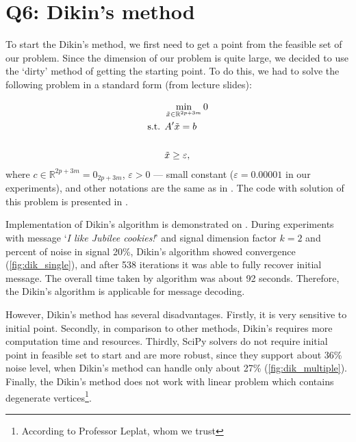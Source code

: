 \documentclass{article}
\def\R{\mathbb{R}}
\def\xt{\tilde{x}}
\begin{document}
\section{Q6: Dikin's method}

To start the Dikin's method, we first need to get a point from the feasible set of our problem. Since the dimension of our problem is quite large, we decided to use the `dirty' method of getting the starting point. To do this, we had to solve the following problem in a standard form (from lecture slides):

\begin{equation}\label{eq:dikin_init}
  \begin{aligned}
                 & \min\limits_{\xt \in \R^{2p+3m}} 0 \\
    \text{s.t. } & A' \tilde{x} = b                   \\
    \vspace{20pt}                                     \\
                 & \xt \geq \varepsilon,
  \end{aligned}
  \vspace{20pt}
\end{equation}
where $c \in \mathbb{R}^{2p+3m} = 0_{2p+3m} $,
$\varepsilon > 0$ --- small constant ($\varepsilon = 0.00001$ in our experiments),
and other notations are the same as in . The code with solution of this problem is presented in .

Implementation of Dikin's algorithm is demonstrated on . During experiments with message `\textit{I like Jubilee cookies!}' and signal dimension factor $k=2$ and percent of noise in signal 20\%, Dikin's algorithm showed convergence (\cref{fig:dik_single}), and after 538 iterations it was able to fully recover initial message. The overall time taken by algorithm was about 92 seconds. Therefore, the Dikin's algorithm is applicable for message decoding.

However, Dikin's method has several disadvantages. Firstly, it is very sensitive to initial point. Secondly, in comparison to other methods, Dikin's requires more computation time and resources. Thirdly, SciPy solvers do not require initial point in feasible set to start and are more robust, since they support about 36\% noise level, when Dikin's method can handle only about 27\% (\cref{fig:dik_multiple}). Finally, the Dikin's method does not work with linear problem which contains degenerate vertices\footnote{According to Professor Leplat, whom we trust}.
\end{document}
